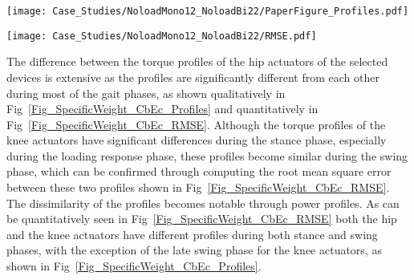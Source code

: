 \documentclass[10pt,letterpaper]{article}
\begin{document}
\begin{figure*}[ht]
	\centering
	\texttt{[image: Case\_Studies/NoloadMono12\_NoloadBi22/PaperFigure\_Profiles.pdf]}
	\caption{{\small\textbf{Torque and power profiles of mono-articular Cb and bi-articular Ec exoskeletons.} The torque and power profiles of assistive devices for subjects walking without an additional load (blue), and net joint power and torque profile for \textit{noload} (green) condition are shown for each actuator of the devices. The torque profile of moment generated by muscles (rose pink) is shown for each joint for both devices. The curves are averaged over 7 subjects with 3 trials and normalized by subject mass; shaded regions around the mean profile indicate standard deviation of the profile.}}
	\label{Fig_SpecificWeight_CbEc_Profiles} \vspace{-.5\baselineskip}
\end{figure*}
\begin{figure*}[ht]
	\centering
	\texttt{[image: Case\_Studies/NoloadMono12\_NoloadBi22/RMSE.pdf]}
	\caption{\small{\textbf{Torque, power, and muscles generated moment profiles of assistive devices. } The root mean square error between actuators of bi-articular and mono-articular devices and the muscles generated moment of subjects assisted by these devices. The RMSE was calculated during a total gait cycle (A), loading response (B), mid stance (C), terminal stance (D), pre swing (E), initial swing (F), mid swing (G), and terminal swing (H) phases.}}
	\label{Fig_SpecificWeight_CbEc_RMSE}
\end{figure*}

The difference between the torque profiles of the hip actuators of the selected devices is extensive as the profiles are significantly different from each other during most of the gait phases, as shown qualitatively in Fig~\ref{Fig_SpecificWeight_CbEc_Profiles} and quantitatively in Fig~\ref{Fig_SpecificWeight_CbEc_RMSE}. Although the torque profiles of the knee actuators have significant differences during the stance phase, especially during the loading response phase, these profiles become similar during the swing phase, which can be confirmed through computing the root mean square error between these two profiles shown in Fig~\ref{Fig_SpecificWeight_CbEc_RMSE}. The dissimilarity of the profiles becomes notable through power profiles. As can be quantitatively seen in Fig~\ref{Fig_SpecificWeight_CbEc_RMSE} both the hip and the knee actuators have different profiles during both stance and swing phases, with the exception of the late swing phase for the knee actuators, as shown in Fig~\ref{Fig_SpecificWeight_CbEc_Profiles}.
	
\end{document}

